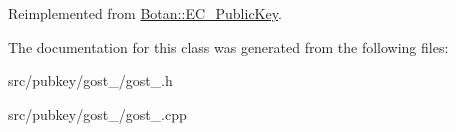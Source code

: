 Reimplemented from \hyperlink{classBotan_1_1EC__PublicKey_ab276d6e5d43c11c12baa3759b532693f}{Botan\-::\-E\-C\-\_\-\-Public\-Key}.



The documentation for this class was generated from the following files\-:\begin{DoxyCompactItemize}
\item 
src/pubkey/gost\-\_/gost\-\_.\-h\item 
src/pubkey/gost\-\_/gost\-\_.\-cpp\end{DoxyCompactItemize}
